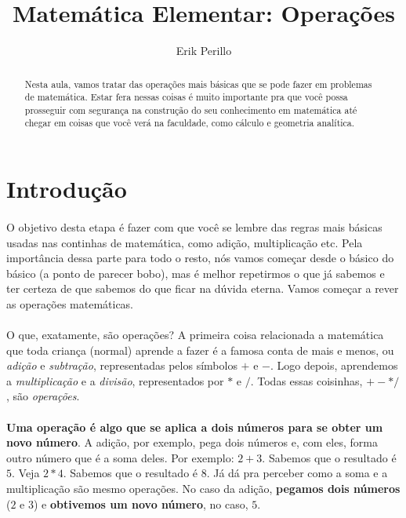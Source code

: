 \documentclass[12pt]{article}
\begin{document}
\title{Matemática Elementar: Operações}
\author{Erik Perillo}
\maketitle

\begin{abstract}
Nesta aula, vamos tratar das operações mais básicas que se pode fazer em 
problemas de matemática. Estar fera nessas coisas é muito importante pra 
que você possa prosseguir com segurança na construção do seu conhecimento em
matemática até chegar em coisas que você verá na faculdade, como cálculo e 
geometria analítica.
\end{abstract}

\newpage

\tableofcontents

\newpage

\section{Introdução}
\paragraph{}
O objetivo desta etapa é fazer com que você se lembre das regras mais básicas
usadas nas continhas de matemática, como adição, multiplicação etc. 
Pela importância dessa parte para todo o resto, nós vamos começar 
desde o básico do básico (a ponto de parecer bobo), mas é melhor repetirmos 
o que já sabemos e ter certeza de que sabemos do que ficar na dúvida eterna.
Vamos começar a rever as operações matemáticas.
\paragraph{}
O que, exatamente, são operações?
A primeira coisa relacionada a matemática que toda criança (normal) aprende a
fazer é a famosa conta de mais e menos, ou \textit{adição} e \textit{subtração}, 
representadas pelos símbolos $+$ e $-$. Logo depois, aprendemos a 
\textit{multiplicação} e a \textit{divisão}, representados por $*$ e $/$. Todas
essas coisinhas, $+ - * /$, são \textit{operações}. 
\paragraph{}
\textbf{Uma operação é algo que se aplica a dois números para se obter um novo
número}. A adição, por exemplo, pega dois números e, com eles, forma outro 
número que é a soma deles. Por exemplo: $2 + 3$. Sabemos que o resultado é $5$.
Veja $2*4$. Sabemos que o resultado é $8$. Já dá pra perceber como a soma e a 
multiplicação são mesmo operações. No caso da adição, \textbf{pegamos dois 
números} ($2$ e $3$) e \textbf{obtivemos um novo número}, no caso, $5$. 
\end{document}
